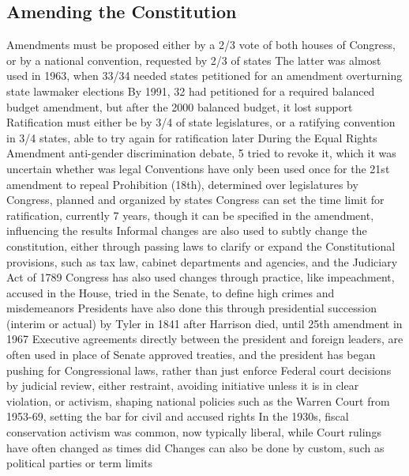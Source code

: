 \documentclass[11 pt, twoside]{article}
\newenvironment{outline*}
{
	\begin{outline}[enumerate]
	}
	{\end{outline}
}
\begin{document}
\subsection{Amending the Constitution}
\begin{outline*}
\1 Amendments must be proposed either by a 2/3 vote of both houses of Congress, or by a national convention, requested by 2/3 of states
\2 The latter was almost used in 1963, when 33/34 needed states petitioned for an amendment overturning state lawmaker elections
\2 By 1991, 32 had petitioned for a required balanced budget amendment, but after the 2000 balanced budget, it lost support
\1 Ratification must either be by 3/4 of state legislatures, or a ratifying convention in 3/4 states, able to try again for ratification later
\2 During the Equal Rights Amendment anti-gender discrimination debate, 5 tried to revoke it, which it was uncertain whether was legal
\2 Conventions have only been used once for the 21st amendment to repeal Prohibition (18th), determined over legislatures by Congress, planned and organized by states
\2 Congress can set the time limit for ratification, currently 7 years, though it can be specified in the amendment, influencing the results
\1 Informal changes are also used to subtly change the constitution, either through passing laws to clarify or expand the Constitutional provisions, such as tax law, cabinet departments and agencies, and the Judiciary Act of 1789
\1 Congress has also used changes through practice, like impeachment, accused in the House, tried in the Senate, to define high crimes and misdemeanors
\2 Presidents have also done this through presidential succession (interim or actual) by Tyler in 1841 after Harrison died, until 25th amendment in 1967
\2 Executive agreements directly between the president and foreign leaders, are often used in place of Senate approved treaties, and the president has began pushing for Congressional laws, rather than just enforce
\1 Federal court decisions by judicial review, either restraint, avoiding initiative unless it is in clear violation, or activism, shaping national policies such as the Warren Court from 1953-69, setting the bar for civil and accused rights
\2 In the 1930s, fiscal conservation activism was common, now typically liberal, while Court rulings have often changed as times did
\1 Changes can also be done by custom, such as political parties or term limits
\end{outline*}
\end{document}
